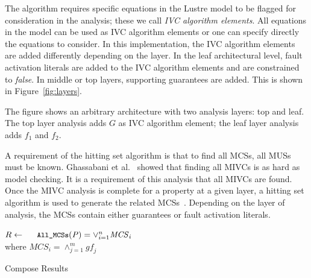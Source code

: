 The \aivcalg algorithm requires  specific equations in the Lustre model to be flagged for consideration in the analysis; these we call \emph{IVC algorithm elements}. All equations in the model can be used as IVC algorithm elements or one can specify directly the equations to consider. In this implementation, the IVC algorithm elements are added differently depending on the layer. In the leaf architectural level, fault activation literals are added to the IVC algorithm elements and are constrained to {\em false}. In middle or top layers, supporting guarantees are added. This is shown in Figure~\ref{fig:layers}. 

The figure shows an arbitrary architecture with two analysis layers: top and leaf. The top layer analysis adds $G$ as IVC algorithm element; the leaf layer analysis adds $f_1$ and $f_2$. 

A requirement of the hitting set algorithm is that to find all MCSs, all MUSs must be known. Ghassabani et al.~\cite{Ghassabani2017EfficientGO} showed that finding all MIVCs is as hard as model checking. It is a requirement of this analysis that all MIVCs are found. Once the MIVC analysis is complete for a property at a given layer, a hitting set algorithm is used to generate the related MCSs~\cite{gainer2017minimal}. Depending on the layer of analysis, the MCSs contain either guarantees or fault activation literals.


\begin{algorithm}[h]

	$R \gets \mathit{\amcs(P)} = \lor_{i=1}^n \mathit{MCS}_i$\\
	where $\mathit{MCS}_i = \land_{j=1}^m \mathit{gf_j}$\\
	\caption{Compose Results}
	\label{alg:compose}
\end{algorithm}

